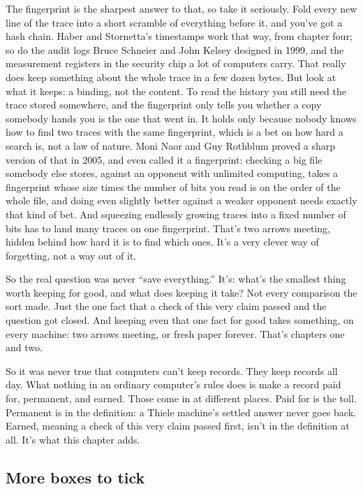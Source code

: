 \documentclass[11pt,twoside]{article}
\theoremstyle{thielethm}
\theoremstyle{thieledef}
\theoremstyle{thieledef}
\theoremstyle{thieledef}
\theoremstyle{thielethm}
\theoremstyle{thieleobs}
\theoremstyle{thielethm}
\begin{document}
The fingerprint is the sharpest answer to that, so take it seriously. Fold every new line of the trace into a short scramble of everything before it, and you've got a hash chain. Haber and Stornetta's timestamps work that way, from chapter four; so do the audit logs Bruce Schneier and John Kelsey designed in 1999, and the measurement registers in the security chip a lot of computers carry. That really does keep something about the whole trace in a few dozen bytes. But look at what it keeps: a binding, not the content. To read the history you still need the trace stored somewhere, and the fingerprint only tells you whether a copy somebody hands you is the one that went in. It holds only because nobody knows how to find two traces with the same fingerprint, which is a bet on how hard a search is, not a law of nature. Moni Naor and Guy Rothblum proved a sharp version of that in 2005, and even called it a fingerprint: checking a big file somebody else stores, against an opponent with unlimited computing, takes a fingerprint whose size times the number of bits you read is on the order of the whole file, and doing even slightly better against a weaker opponent needs exactly that kind of bet. And squeezing endlessly growing traces into a fixed number of bits has to land many traces on one fingerprint. That's two arrows meeting, hidden behind how hard it is to find which ones. It's a very clever way of forgetting, not a way out of it.

So the real question was never ``save everything.'' It's: what's the smallest thing worth keeping for good, and what does keeping it take? Not every comparison the sort made. Just the one fact that a check of this very claim passed and the question got closed. And keeping even that one fact for good takes something, on every machine: two arrows meeting, or fresh paper forever. That's chapters one and two.

So it was never true that computers can't keep records. They keep records all day. What nothing in an ordinary computer's rules does is make a record paid for, permanent, and earned. Those come in at different places. Paid for is the toll. Permanent is in the definition: a Thiele machine's settled answer never goes back. Earned, meaning a check of this very claim passed first, isn't in the definition at all. It's what this chapter adds.

\subsection{More boxes to tick}
\end{document}
